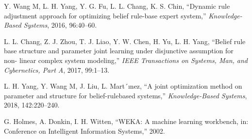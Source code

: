 \documentclass{ieeeaccess}
\begin{document}
\begin{thebibliography}{00}
     Y. Wang M, L. H. Yang, Y. G. Fu, L. L. Chang, K. S. Chin, ``Dynamic rule adjustment approach for optimizing belief rule-base expert system,''
    \emph{Knowledge-Based Systems}, 2016, 96:40–60.

     L. L. Chang, Z. J. Zhou, T. J. Liao, Y. W. Chen, H. Yu, L. H. Yang, ``Belief rule base structure and parameter joint learning under disjunctive assumption for non- linear complex system modeling,''
    \emph{IEEE Transactions on Systems, Man, and Cybernetics, Part A}, 2017, 99:1–13.

     L. H. Yang, Y. Wang M, J. Liu, L. Mart´ınez, ``A joint optimization method on parameter and structure for belief-rulebased systems,''
    \emph{Knowledge-Based Systems}, 2018, 142:220–240.

     G. Holmes, A. Donkin, I. H. Witten, ``WEKA: A machine learning workbench,
    in: Conference on Intelligent Information Systems,'' 2002.

\end{thebibliography}
\end{document}
